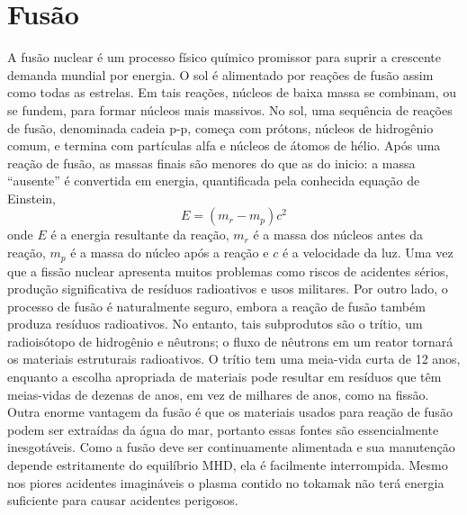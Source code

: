 \documentclass[12pt,oneside,a4paper]{abntex2}
\begin{document}
\section{Fusão} 

A fusão nuclear é um processo físico químico promissor para suprir a crescente demanda mundial por energia. O sol é alimentado por reações de fusão assim como todas as estrelas. Em tais reações, núcleos de baixa massa se combinam, ou se fundem, para formar núcleos mais massivos. No sol, uma sequência de reações de fusão, denominada cadeia p-p, começa com prótons, núcleos de hidrogênio comum, e termina com partículas alfa e núcleos de átomos de hélio. Após uma reação de fusão, as massas finais são menores do que as do inicio: a massa “ausente” é convertida em energia, quantificada pela conhecida equação de Einstein,
$$ E = (m_r - m_p)c^2 $$ 
onde $E$ é a energia resultante da reação, $m_r$ é a massa dos núcleos antes da reação, $m_p$ é a massa do núcleo após a reação e $c$ é a velocidade da luz. Uma vez que a fissão nuclear apresenta muitos problemas como riscos de acidentes sérios, produção significativa de resíduos radioativos e usos militares. Por outro lado, o processo de fusão é naturalmente seguro, embora a reação de fusão também produza resíduos radioativos. No entanto, tais subprodutos são o trítio, um radioisótopo de hidrogênio e nêutrons; o fluxo de nêutrons em um reator tornará os materiais estruturais radioativos. O trítio tem uma meia-vida curta de 12 anos, enquanto a escolha apropriada de materiais pode resultar em resíduos que têm meias-vidas de dezenas de anos, em vez de milhares de anos, como na fissão. Outra enorme vantagem da fusão é que os materiais usados para reação de fusão podem ser extraídas da água do mar, portanto essas fontes são essencialmente inesgotáveis. Como a fusão deve ser continuamente alimentada e sua manutenção depende estritamente do equilíbrio MHD, ela é facilmente interrompida. Mesmo nos piores acidentes imagináveis o plasma contido no tokamak  não terá energia suficiente para causar acidentes perigosos.
\end{document}

